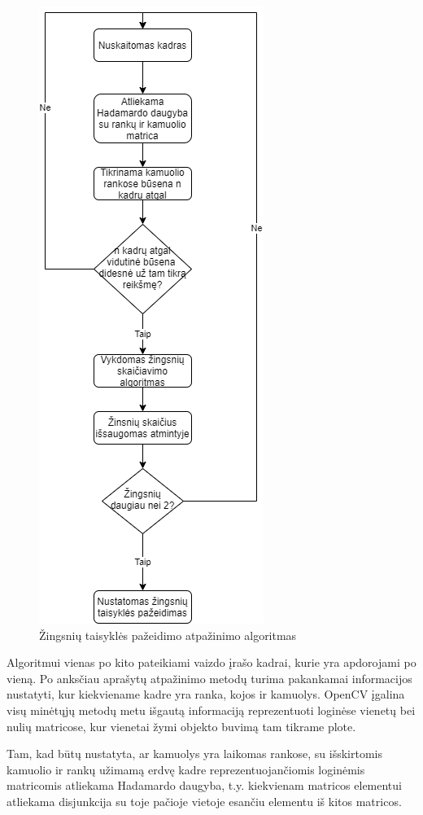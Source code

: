 \documentclass{VUMIFPSbakalaurinis}
\begin{document}
\begin{figure}[H]
	\centering
	\includegraphics[scale=0.6]{img/travel_algorithm}
	\caption{Žingsnių taisyklės pažeidimo atpažinimo algoritmas}
	\label{img:travel_algo}
\end{figure}

Algoritmui vienas po kito pateikiami vaizdo įrašo kadrai, kurie yra apdorojami po vieną. Po anksčiau aprašytų atpažinimo metodų turima pakankamai informacijos nustatyti, kur kiekviename kadre yra ranka, kojos ir kamuolys. OpenCV įgalina visų minėtųjų metodų metu išgautą informaciją reprezentuoti loginėse vienetų bei nulių matricose, kur vienetai žymi objekto buvimą tam tikrame plote. 

Tam, kad būtų nustatyta, ar kamuolys yra laikomas rankose, su išskirtomis kamuolio ir rankų užimamą erdvę kadre reprezentuojančiomis loginėmis matricomis atliekama Hadamardo daugyba, t.y. kiekvienam matricos elementui atliekama disjunkcija su toje pačioje vietoje esančiu elementu iš kitos matricos.
\end{document}
